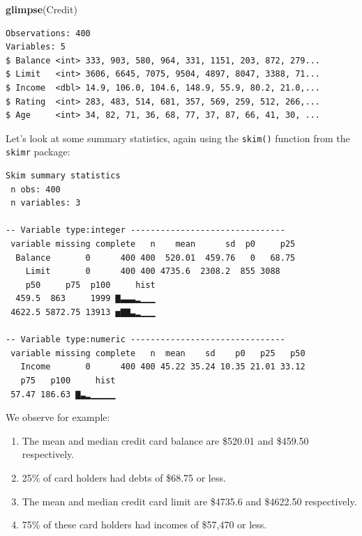 \documentclass[12pt,]{krantz}
\makeatletter
\newenvironment{Shaded}{\begin{snugshade}}{\end{snugshade}}
\newcommand{\KeywordTok}[1]{\textcolor[rgb]{0.27,0.27,0.27}{\textbf{#1}}}
\newcommand{\StringTok}[1]{\textcolor[rgb]{0.5,0.5,0.5}{#1}}
\newcommand{\OperatorTok}[1]{\textcolor[rgb]{0.43,0.43,0.43}{\textbf{#1}}}
\newcommand{\NormalTok}[1]{#1}
\providecommand{\tightlist}{%
  \setlength{\itemsep}{0pt}\setlength{\parskip}{0pt}}
\newenvironment{kframe}{%
\medskip{}
\setlength{\fboxsep}{.8em}
 \def\at@end@of@kframe{}%
 \ifinner\ifhmode%
  \def\at@end@of@kframe{\end{minipage}}%
  \begin{minipage}{\columnwidth}%
 \fi\fi%
 \def\FrameCommand##1{\hskip\@totalleftmargin \hskip-\fboxsep
 \colorbox{shadecolor}{##1}\hskip-\fboxsep
     \hskip-\linewidth \hskip-\@totalleftmargin \hskip\columnwidth}%
 \MakeFramed {\advance\hsize-\width
   \@totalleftmargin\z@ \linewidth\hsize
   \@setminipage}}%
 {\par\unskip\endMakeFramed%
 \at@end@of@kframe}
\renewenvironment{Shaded}{\begin{kframe}}{\end{kframe}}
\theoremstyle{definition}
\theoremstyle{definition}
\theoremstyle{definition}
\theoremstyle{remark}
\makeatother
\begin{document}
\begin{Shaded}
\begin{Highlighting}[]
\KeywordTok{glimpse}\NormalTok{(Credit)}
\end{Highlighting}
\end{Shaded}

\begin{verbatim}
Observations: 400
Variables: 5
$ Balance <int> 333, 903, 580, 964, 331, 1151, 203, 872, 279...
$ Limit   <int> 3606, 6645, 7075, 9504, 4897, 8047, 3388, 71...
$ Income  <dbl> 14.9, 106.0, 104.6, 148.9, 55.9, 80.2, 21.0,...
$ Rating  <int> 283, 483, 514, 681, 357, 569, 259, 512, 266,...
$ Age     <int> 34, 82, 71, 36, 68, 77, 37, 87, 66, 41, 30, ...
\end{verbatim}

Let's look at some summary statistics, again using the \texttt{skim()}
function from the \texttt{skimr} package:

\begin{Shaded}
\end{Shaded}

\begin{verbatim}
Skim summary statistics
 n obs: 400 
 n variables: 3 

-- Variable type:integer -------------------------------
 variable missing complete   n    mean      sd  p0     p25
  Balance       0      400 400  520.01  459.76   0   68.75
    Limit       0      400 400 4735.6  2308.2  855 3088   
    p50     p75  p100     hist
  459.5  863     1999 ▇▃▃▃▂▁▁▁
 4622.5 5872.75 13913 ▅▇▇▃▂▁▁▁

-- Variable type:numeric -------------------------------
 variable missing complete   n  mean    sd    p0   p25   p50
   Income       0      400 400 45.22 35.24 10.35 21.01 33.12
   p75   p100     hist
 57.47 186.63 ▇▃▂▁▁▁▁▁
\end{verbatim}

We observe for example:

\begin{enumerate}
\def\labelenumi{\arabic{enumi}.}
\tightlist
\item
  The mean and median credit card balance are \$520.01 and \$459.50
  respectively.
\item
  25\% of card holders had debts of \$68.75 or less.
\item
  The mean and median credit card limit are \$4735.6 and \$4622.50
  respectively.
\item
  75\% of these card holders had incomes of \$57,470 or less.
\end{enumerate}
\end{document}
